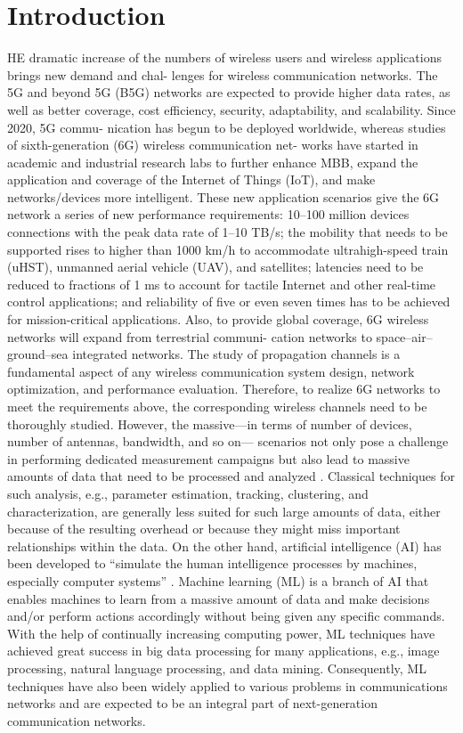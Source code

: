 \documentclass[conference]{IEEEtran}
\begin{document}
\section{Introduction}
      
HE dramatic increase of the numbers of wireless users
and wireless applications brings new demand and chal-
lenges for wireless comm\cite{222}unication networks. The 5G and
beyond 5G (B5G) networks are expected to provide higher
data rates, as well as better coverage, cost efficiency, security,
adaptability, and scalability. Since 2020, 5G commu-
nication has begun to be deployed worldwide, whereas
studies of sixth-generation (6G) wireless communication net-
works have started in academic and industrial research labs
to further enhance MBB, expand the application and coverage
of the Internet of Things (IoT), and make networks/devices
more intelligent. These new application scenarios give the
6G network a series of new performance requirements:
10–100 million devices connections\cite{666} with the peak data rate
of 1–10 TB/s; the mobility that needs to be supported rises to
higher than 1000 km/h to accommodate ultrahigh-speed train
(uHST), unmanned aerial vehicle (UAV), and satellites;
latencies need to be reduced to fractions of 1 ms to account
for tactile Internet and other real-time control applications; and
reliability of five or even seven times has to be achieved for
mission-critical applications. Also, to provide global coverage,
6G wireless networks will expand from terrestrial communi-
cation networks to space–air–ground–sea integrated networks.
The study of propagation channels is a fundamental aspect
of any wireless communication system design, network
optimization, and performance evaluation. Therefore,
to realize 6G networks to meet the requirements above,
the corresponding wireless channels need to be thoroughly
studied. However, the massive—in terms of number of
devices, number of antennas, bandwidth, and so on—
scenarios not only pose a challenge in performing dedicated
measurement campaigns but also lead to massive amounts of
data that need to be processed and analyzed . Classical
techniques for such analysis, e.g., parameter estimation,
tracking, clustering, and characterization, are generally less
suited for such large amounts of data, either because of the
resulting overhead or because they might miss important
relationships within the data.
On the other hand, artificial intelligence (AI) has been
developed to “simulate the human intelligence\cite{100} processes
by machines, especially computer systems” . Machine
learning (ML) is a branch of AI that enables machines to learn
from a massive amount of data and make decisions and/or
perform actions accordingly without being given any specific
commands. With the help of continually increasing computing
power, ML techniques have achieved great success in big
data processing for many applications, e.g., image processing,
natural language processing, and data mining. Consequently,
ML techniques have also been widely applied to various
problems in communications networks and are expected
to be an integral part of next-generation communication
networks.
\end{document}
